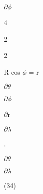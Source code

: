 \documentclass[a4paper,portrait,12pt]{article}
\begin{document}
\begin{flushleft}
\newpage
 $\partial$$\phi$
\end{flushleft}


4


2


2\newpage



\begin{flushleft}
R cos $\phi$ = r \newpage

\end{flushleft}


\begin{flushleft}
\newpage
 $\partial$$\theta$
\end{flushleft}


\newpage



\newpage



\begin{flushleft}
$\partial$$\phi$
\end{flushleft}





\newpage



\begin{flushleft}
$\partial$r 
\end{flushleft}


\newpage



\begin{flushleft}
$\partial$$\lambda$ \newpage
\newpage

\end{flushleft}


\newpage
 .


\begin{flushleft}
$\partial$$\theta$ \newpage
\newpage

\end{flushleft}


\newpage



\begin{flushleft}
$\partial$$\lambda$
\end{flushleft}





(34)





\end{document}
